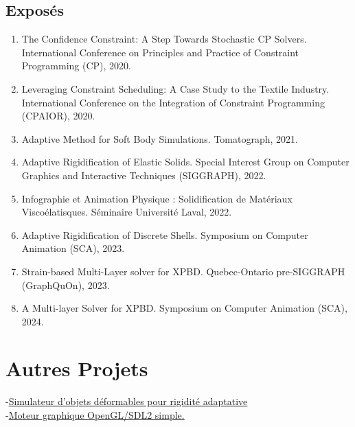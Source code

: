 \documentclass[10pt]{article} %
\begin{document}
\subsection{Exposés}
\begin{enumerate}
  \setcounter{enumi}{\value{listCounter}}
  \item The Confidence Constraint: A Step Towards Stochastic CP Solvers. International Conference on Principles and Practice of Constraint Programming (CP), 2020.
  \item  Leveraging Constraint Scheduling: A Case Study to the Textile Industry. International Conference on the Integration of Constraint Programming (CPAIOR), 2020.
  \item Adaptive Method for Soft Body Simulations. Tomatograph, 2021.
  \item Adaptive Rigidification of Elastic Solids. Special Interest Group on Computer Graphics and Interactive Techniques (SIGGRAPH), 2022. 
  \item Infographie et Animation Physique : Solidification de Matériaux Viscoélatisques.  Séminaire Université Laval, 2022.
  \item Adaptive Rigidification of Discrete Shells. Symposium on Computer Animation (SCA), 2023. 
  \item Strain-based Multi-Layer solver for XPBD. Quebec-Ontario pre-SIGGRAPH (GraphQuOn), 2023.
  \item A Multi-layer Solver for XPBD. Symposium on Computer Animation (SCA), 2024. 
\end{enumerate}


\section{Autres Projets}

{
-\href{https://github.com/AlexandreMercierAubin/AdaptiveRigidification2022}{Simulateur d'objets déformables pour rigidité adaptative}\\
-\href{https://github.com/AlexandreMercierAubin/ComputerGraphics}{Moteur graphique OpenGL/SDL2 simple.}\\

}
\end{document}
